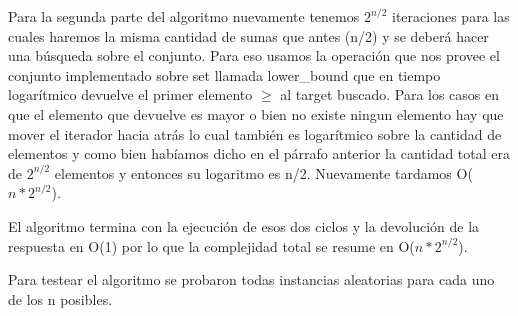 Para la segunda parte del algoritmo nuevamente tenemos $2 ^{n/2}$ iteraciones para las cuales haremos la misma cantidad de sumas que antes (n/2) y se deberá hacer una búsqueda sobre el conjunto. Para eso usamos la operación que nos provee el conjunto implementado sobre set llamada lower_bound que en tiempo logarítmico devuelve el primer elemento $\geq$ al target buscado. Para los casos en que el elemento que devuelve es mayor o bien no existe ningun elemento hay que mover el iterador hacia atrás lo cual también es logarítmico sobre la cantidad de elementos y como bien habíamos dicho en el párrafo anterior la cantidad total era de $2 ^{n/2}$ elementos y entonces su logaritmo es n/2. Nuevamente tardamos O($n * 2 ^{n/2}$).

El algoritmo termina con la ejecución de esos dos ciclos y la devolución de la respuesta en O(1) por lo que la complejidad total se resume en O($n * 2 ^{n/2}$).

Para testear el algoritmo se probaron todas instancias aleatorias para cada uno de los n posibles.
